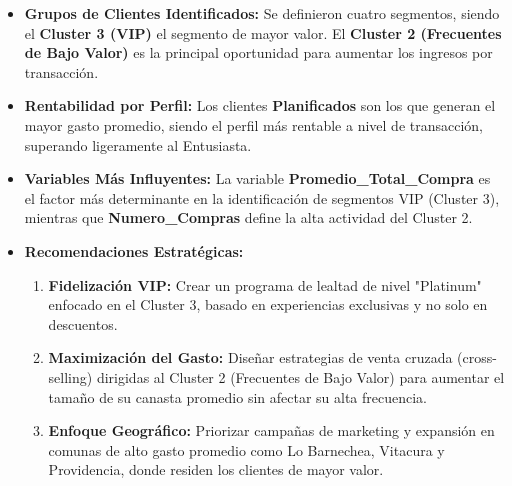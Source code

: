 \documentclass[12pt,a4paper]{article}
\begin{document}
\begin{itemize}
    \item \textbf{Grupos de Clientes Identificados:} Se definieron cuatro segmentos, siendo el \textbf{Cluster 3 (VIP)} el segmento de mayor valor. El \textbf{Cluster 2 (Frecuentes de Bajo Valor)} es la principal oportunidad para aumentar los ingresos por transacción.
    \item \textbf{Rentabilidad por Perfil:} Los clientes \textbf{Planificados} son los que generan el mayor gasto promedio, siendo el perfil más rentable a nivel de transacción, superando ligeramente al Entusiasta.
    \item \textbf{Variables Más Influyentes:} La variable \textbf{Promedio\_Total\_Compra} es el factor más determinante en la identificación de segmentos VIP (Cluster 3), mientras que \textbf{Numero\_Compras} define la alta actividad del Cluster 2.
    \item \textbf{Recomendaciones Estratégicas:}
    \begin{enumerate}
        \item \textbf{Fidelización VIP:} Crear un programa de lealtad de nivel "Platinum" enfocado en el Cluster 3, basado en experiencias exclusivas y no solo en descuentos.
        \item \textbf{Maximización del Gasto:} Diseñar estrategias de venta cruzada (cross-selling) dirigidas al Cluster 2 (Frecuentes de Bajo Valor) para aumentar el tamaño de su canasta promedio sin afectar su alta frecuencia.
        \item \textbf{Enfoque Geográfico:} Priorizar campañas de marketing y expansión en comunas de alto gasto promedio como Lo Barnechea, Vitacura y Providencia, donde residen los clientes de mayor valor.
    \end{enumerate}
\end{itemize}
\end{document}
